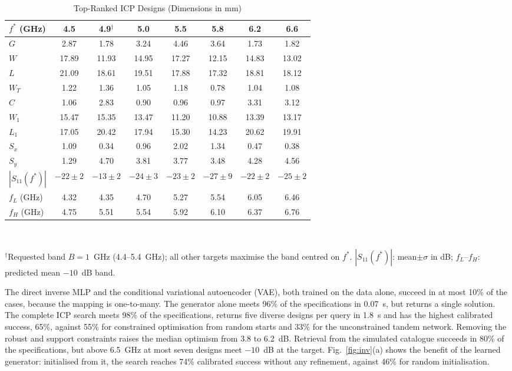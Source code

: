 \documentclass[conference,a4paper]{IEEEtran}
\begin{document}
\begin{table}[!t]
\centering
\caption{Top-Ranked ICP Designs (Dimensions in mm)}
\label{tab:designs}
\scriptsize
\setlength{\tabcolsep}{2.4pt}
\begin{tabular}{lccccccc}
\toprule
$f^*$ (GHz) & 4.5 & 4.9$^\dagger$ & 5.0 & 5.5 & 5.8 & 6.2 & 6.6 \\
\midrule
$G$ & 2.87 & 1.78 & 3.24 & 4.46 & 3.64 & 1.73 & 1.82 \\
$W$ & 17.89 & 11.93 & 14.95 & 17.27 & 12.15 & 14.83 & 13.02 \\
$L$ & 21.09 & 18.61 & 19.51 & 17.88 & 17.32 & 18.81 & 18.12 \\
$W_T$ & 1.22 & 1.36 & 1.05 & 1.18 & 0.78 & 1.04 & 1.08 \\
$C$ & 1.06 & 2.83 & 0.90 & 0.96 & 0.97 & 3.31 & 3.12 \\
$W_1$ & 15.47 & 15.35 & 13.47 & 11.20 & 10.88 & 13.39 & 13.17 \\
$L_1$ & 17.05 & 20.42 & 17.94 & 15.30 & 14.23 & 20.62 & 19.91 \\
$S_x$ & 1.09 & 0.34 & 0.96 & 2.02 & 1.34 & 0.47 & 0.38 \\
$S_y$ & 1.29 & 4.70 & 3.81 & 3.77 & 3.48 & 4.28 & 4.56 \\
\midrule
$|S_{11}(f^*)|$ & $-22{\pm}2$ & $-13{\pm}2$ & $-24{\pm}3$ & $-23{\pm}2$ & $-27{\pm}9$ & $-22{\pm}2$ & $-25{\pm}2$ \\
$f_L$ (GHz) & 4.32 & 4.35 & 4.70 & 5.27 & 5.54 & 6.05 & 6.46 \\
$f_H$ (GHz) & 4.75 & 5.51 & 5.54 & 5.92 & 6.10 & 6.37 & 6.76 \\
\bottomrule
\end{tabular}\\[2pt]
\parbox{\columnwidth}{\scriptsize $^\dagger$Requested band $B=1$~GHz (4.4--5.4~GHz); all other targets maximise the band centred on $f^*$. $|S_{11}(f^*)|$: mean$\pm\sigma$ in dB; $f_L$--$f_H$: predicted mean $-10$~dB band.}
\end{table}

The direct inverse MLP and the conditional variational autoencoder (VAE), both trained on the data alone, succeed in at most 10\% of the cases, because the mapping is one-to-many. The generator alone meets 96\% of the specifications in 0.07~s, but returns a single solution. The complete ICP search meets 98\% of the specifications, returns five diverse designs per query in 1.8~s and has the highest calibrated success, 65\%, against 55\% for constrained optimisation from random starts and 33\% for the unconstrained tandem network. Removing the robust and support constraints raises the median optimism from 3.8 to 6.2~dB. Retrieval from the simulated catalogue succeeds in 80\% of the specifications, but above 6.5~GHz at most seven designs meet $-10$~dB at the target. Fig.~\ref{fig:inv}(a) shows the benefit of the learned generator: initialised from it, the search reaches 74\% calibrated success without any refinement, against 46\% for random initialisation.
\end{document}
